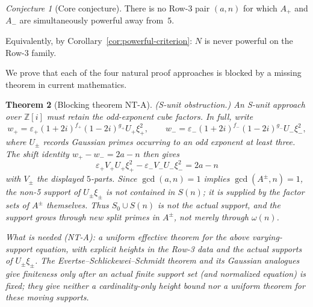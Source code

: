 \documentclass[12pt]{amsart}
\theoremstyle{plain}
\newtheorem{theorem}{Theorem}[section]
\theoremstyle{definition}
\theoremstyle{remark}
\newtheorem{conjecture}[theorem]{Conjecture}
\newcommand{\Zi}{\mathbb{Z}[i]}
\newcommand{\Aplus}{A_{+}}
\newcommand{\Aminus}{A_{-}}
\begin{document}
\begin{conjecture}[Core conjecture]
\label{conj:core}
There is no Row-3 pair $(a,n)$ for which $\Aplus$ and $\Aminus$ are
simultaneously powerful away from~$5$.
\end{conjecture}

\noindent
Equivalently, by Corollary~\ref{cor:powerful-criterion}: $N$ is never
powerful on the Row-3 family.

We prove that each of the four natural proof approaches is blocked by
a missing theorem in current mathematics.

\begin{theorem}[Blocking theorem NT-A]
\label{thm:NTA}
\textup{(S-unit obstruction.)}
An S-unit approach over $\Zi$ must retain the odd-exponent cube factors.
In full, write
\[
w_+=\varepsilon_+(1+2i)^{f_+}(1-2i)^{g_+}U_+\xi_+^2,\qquad
w_-=\varepsilon_-(1+2i)^{f_-}(1-2i)^{g_-}U_-\xi_-^2,
\]
where $U_\pm$ records Gaussian primes occurring to an odd exponent at least
three.  The shift identity $w_+-w_-=2a-n$ then gives
\[
\varepsilon_+V_+U_+\xi_+^2-\varepsilon_-V_-U_-\xi_-^2=2a-n
\]
with $V_\pm$ the displayed $5$-parts.  Since $\gcd(a,n)=1$ implies
$\gcd(A^\pm,n)=1$, the non-5 support of $U_\pm\xi_\pm$ is not contained in
$S(n)$; it is supplied by the factor sets of $A^\pm$ themselves.  Thus
$S_0\cup S(n)$ is not the actual support, and the support grows through new
split primes in $A^\pm$, not merely through $\omega(n)$.

\medskip
\noindent\emph{What is needed} \textup{(NT-A)}: a uniform effective theorem for the
above varying-support equation, with explicit heights in the Row-3 data and the
actual supports of $U_\pm\xi_\pm$.  The Evertse--Schlickewei--Schmidt theorem
\cite{Evertse1984,Schmidt1990} and its Gaussian analogues give finiteness only
after an actual finite support set (and normalized equation) is fixed; they
give neither a cardinality-only height bound nor a uniform theorem for these
moving supports.
\end{theorem}
\end{document}
